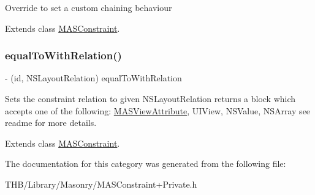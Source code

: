 Override to set a custom chaining behaviour 

Extends class \mbox{\hyperlink{interface_m_a_s_constraint_a432981551ebd6025204a33e5e4676c97}{M\+A\+S\+Constraint}}.

\mbox{\label{category_m_a_s_constraint_07_abstract_08_a06df7a7cb2a7c3e32197800487d8d927}} 
\subsubsection{\texorpdfstring{equal\+To\+With\+Relation()}{equalToWithRelation()}}
{\footnotesize\ttfamily -\/ (id, N\+S\+Layout\+Relation) equal\+To\+With\+Relation \begin{DoxyParamCaption}{ }\end{DoxyParamCaption}}

Sets the constraint relation to given N\+S\+Layout\+Relation returns a block which accepts one of the following\+: \mbox{\hyperlink{interface_m_a_s_view_attribute}{M\+A\+S\+View\+Attribute}}, U\+I\+View, N\+S\+Value, N\+S\+Array see readme for more details. 

Extends class \mbox{\hyperlink{interface_m_a_s_constraint_a06df7a7cb2a7c3e32197800487d8d927}{M\+A\+S\+Constraint}}.



The documentation for this category was generated from the following file\+:\begin{DoxyCompactItemize}
\item 
T\+H\+B/\+Library/\+Masonry/M\+A\+S\+Constraint+\+Private.\+h\end{DoxyCompactItemize}
